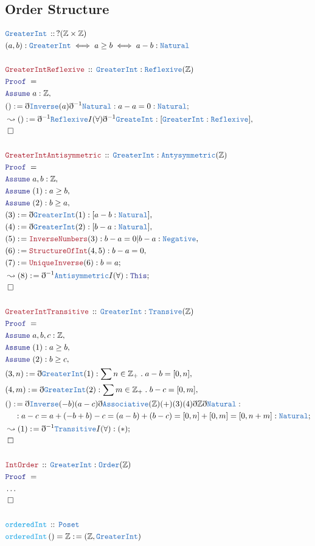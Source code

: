 \documentclass[12pt]{scrartcl}
\newcommand{\TYPE}[1]{\textcolor{NavyBlue}{\mathtt{#1}}}
\newcommand{\FUNC}[1]{\textcolor{Cerulean}{\mathtt{#1}}}
\newcommand{\LOGIC}[1]{\textcolor{Blue}{\mathtt{#1}}}
\newcommand{\THM}[1]{\textcolor{Maroon}{\mathtt{#1}}}
\renewcommand{\.}{\; . \;}
\newcommand{\de}{: \kern 0.1pc =}
\newcommand{\Act}[1]{\left( #1 \right)}
\newcommand{\Theorem}[2]{& \THM{#1} \, :: \, #2 \\ & \Proof = \\ }
\newcommand{\DeclareType}[2]{& \TYPE{#1} \, :: \, #2 \\}
\newcommand{\DefineNamedType}[4]{& #1 : \TYPE{#2} \iff #3 \iff #4 \\}
\newcommand{\DeclareFunc}[2]{& \FUNC{#1} \, :: \, #2 \\}
\newcommand{\DefineNamedFunc}[4]{&  \FUNC{#1}\Act{#2} = #3 \de #4 \\}
\newcommand{\NewLine}{\\ & \kern 1pc}
\newcommand{\Page}[1]{ \begin{align*} #1 \end{align*}   }
\newcommand{ \bd }{ \ByDef }
\newcommand{\NoProof}{ & \ldots \\ \EndProof}
\newcommand{\Int}{\mathbb{Z} }
\newcommand{\Say}[3]{& #1 \de #2 : #3, \\}
\newcommand{\Conclude}[3]{& #1 \de #2 : #3; \\}
\newcommand{\Derive}[3]{& \leadsto #1 \de #2 : #3, \\}
\newcommand{\DeriveConclude}[3]{& \leadsto #1 \de #2 : #3 ; \\}
\newcommand{\Assume}[2]{& \LOGIC{Assume} \; #1 : #2, \\}
\newcommand{\QED}{\; \square}
\newcommand{\EndProof}{& \QED \\}
\newcommand{\ByDef}{\eth}
\newcommand{\Proof}{\LOGIC{Proof} \; }
\begin{document}
\subsection{Order Structure}
\Page{
	\DeclareType{GreaterInt}{?(\Int \times \Int) }
	\DefineNamedType{(a,b)}{GreaterInt}{a \ge b }{a - b : \TYPE{Natural}}
	\\
	\Theorem{GreaterIntReflexive}{\TYPE{GreaterInt} : \TYPE{Reflexive}(\Int)}
	\Assume{a}{\Int}
	\Conclude{()}{\bd \TYPE{Inverse}(a) \bd^{-1} \TYPE{Natural}}{  a - a = 0 : \TYPE{Natural}}
	\Derive{()}{\bd^{-1}\TYPE{Reflexive}I(\forall)\bd^{-1}\TYPE{GreateInt}}{[\TYPE{GreaterInt}: \TYPE{Reflexive}]}
	\EndProof
	\\
	\Theorem{GreaterIntAntisymmetric}{\TYPE{GreaterInt} : \TYPE{Antysymmetric}(\Int)}
	\Assume{a,b}{\Int}
	\Assume{(1)}{a \ge b}
	\Assume{(2)}{b \ge a}
	\Say{(3)}{\bd \TYPE{GreaterInt}(1)}{[a - b : \TYPE{Natural}]}
	\Say{(4)}{\bd \TYPE{GreaterInt}(2)}{[b - a : \TYPE{Natural}]}
	\Say{(5)}{\THM{InverseNumbers}(3)}{b - a = 0 |b - a : \TYPE{Negative}}
	\Say{(6)}{\THM{StructureOfInt}(4,5)}{ b - a = 0  }
	\Conclude{(7)}{\THM{UniqueInverse}(6)}{b=a}
	\DeriveConclude{(8)}{\bd^{-1} \TYPE{Antisymmetric}I(\forall) }{\LOGIC{This}}
	\EndProof
	\\
	\Theorem{GreaterIntTransitive}{\TYPE{GreaterInt} : \TYPE{Transive}(\Int)}
	\Assume{a,b,c}{\Int}
	\Assume{(1)}{a \ge b}
	\Assume{(2)}{b \ge c}
	\Say{(3,n)}{\bd \TYPE{GreaterInt}(1)}{\sum n \in \Int_+ \. a  - b =  [0,n]}
	\Say{(4,m)}{\bd \TYPE{GreaterInt}(2)}{\sum m \in \Int_+ \. b - c = [0,m]}
	\Conclude{()}{ \bd \TYPE{Inverse}(-b)(a - c)\bd \TYPE{Associative}(\Int)(+)(3)(4)\bd \Int \bd \TYPE{Natural}  }
	{  \NewLine :
		a - c = 
		a + (-b + b) - c = 
		(a - b) + (b - c) = 
		[0,n] + [0,m] = 
		[0,n + m] : \TYPE{Natural}   
	}
	\DeriveConclude{(1)}{\bd^{-1} \TYPE{Transitive}I(\forall)}{(*)}
	\EndProof
	\\
	\Theorem{IntOrder}{\TYPE{GreaterInt} :\TYPE{Order}(\Int)}
	\NoProof
	\\
	\DeclareFunc{orderedInt}{\TYPE{Poset}}
	\DefineNamedFunc{orderedInt}{}{\Int}{(\Int,\TYPE{GreaterInt})}
	\\
}
\end{document}
